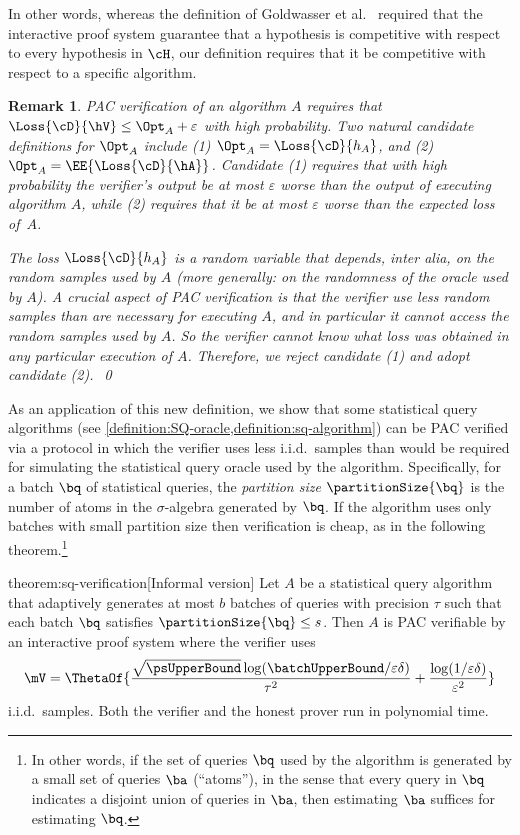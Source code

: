 \documentclass[11pt]{article}
\newtheorem{remark}[theorem]{Remark}
\begin{document}
In other words, whereas the definition of Goldwasser et al.\ \cite{GoldwasserRSY21} required that the interactive proof system guarantee that a hypothesis is competitive with respect to every hypothesis in $\cH$, our definition requires that it be competitive with respect to a specific algorithm.  

\begin{remark}
	PAC verification of an algorithm $A$ requires that $\Loss{\cD}{\hV} \leq \Opt_A + \varepsilon$ with high probability. Two natural candidate definitions for $\Opt_A$ include (1) $\Opt_A = \Loss{\cD}{h_A}$, and (2) $\Opt_A = \EE{\Loss{\cD}{\hA}}$. Candidate (1) requires that with high probability the verifier's output be at most $\varepsilon$ worse than the output of executing algorithm $A$, while (2) requires that it be at most $\varepsilon$ worse than the expected loss of~$A$.

	The loss $\Loss{\cD}{h_A}$ is a random variable that depends, inter alia, on the random samples used by $A$ (more generally: on the randomness of the oracle used by $A$). A crucial aspect of PAC verification is that the verifier use less random samples than are necessary for executing $A$, and in particular it cannot access the random samples used by $A$. So the verifier cannot know what loss was obtained in any particular execution of $A$. Therefore, we reject candidate (1) and adopt candidate (2).~\qed
\end{remark}

As an application of this new definition, we show that some statistical query algorithms (see \cref{definition:SQ-oracle,definition:sq-algorithm}) can be PAC verified via a protocol in which the verifier uses less i.i.d.\ samples than would be required for simulating the statistical query oracle used by the algorithm. Specifically, for a batch $\bq$ of statistical queries, the \emph{partition size} $\partitionSize{\bq}$ is the number of atoms in the $\sigma$-algebra generated by $\bq$. If the algorithm uses only batches with small partition size then verification is cheap, as in the following theorem.\footnote{%
	In other words, if the set of queries $\bq$ used by the algorithm is generated by a small set of queries $\ba$ (``atoms''), in the sense that every query in $\bq$ indicates a disjoint union of queries in $\ba$, then estimating $\ba$ suffices for estimating $\bq$.
}

\begin{reptheorem}{theorem:sq-verification}[Informal version]
	Let $A$ be a statistical query algorithm that adaptively generates at most $b$ batches of queries with precision $\tau$ such that each batch $\bq$ satisfies $\partitionSize{\bq} \leq s$.	Then $A$ is PAC verifiable by an interactive proof system where the verifier uses
	\[
		\mV = \ThetaOf{\frac{\sqrt{\psUpperBound}\log(\batchUpperBound/\varepsilon\delta)}{\tau^2} + \frac{\log(1/\varepsilon\delta)}{\varepsilon^2}}
	\]
	i.i.d.\ samples. Both the verifier and the honest prover run in polynomial time.
\end{reptheorem}
\end{document}
